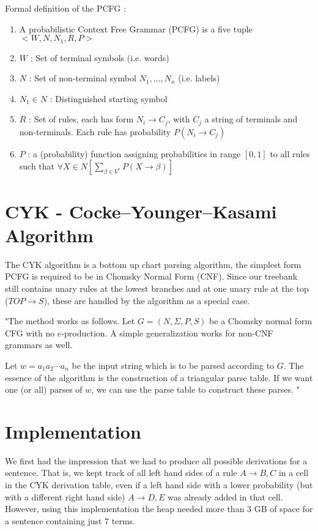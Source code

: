 \documentclass[11pt,twocolumn]{article}
\begin{document}
Formal definition of the PCFG \cite{slides2}:
\begin{enumerate}
\item A probabilistic Context Free Grammar (PCFG) is a five tuple $< W, N, N_1, R, P >$
\item $W$ : Set of terminal symbols (i.e. words)
\item $N$ : Set of non-terminal symbol $N_1, \ldots , N_n$ (i.e. labels)
\item $N_1 \in N$ : Distinguished starting symbol
\item $R$ : Set of rules, each has form $N_i \rightarrow C_j$, with $C_j$ a string of terminals and non-terminals. Each rule has probability $P (N_i \rightarrow C_j )$
\item $P$ : a (probability) function assigning probabilities in range $[0, 1]$ to all rules such that $\forall X \in N \left[ \sum_{\beta \in V^*} P (X \rightarrow \beta) \right]$
\end{enumerate}

\section{CYK - Cocke–Younger–Kasami Algorithm}
The CYK algorithm is a bottom up chart parsing algorithm, the simplest form PCFG is required to be in Chomsky Normal Form (CNF). Since our treebank still contains unary rules at the lowest branches and at one unary rule at the top ($TOP \rightarrow S$), these are handled by the algorithm as a special case.

"The method works as follows. Let $G = (N, \Sigma , P, S)$ be a Chomsky normal form CFG with no $e$-production. A simple generalization works for non-CNF grammars as well. 

Let $w = a_1 a_2 \cdots a_n$ be the input string which is to be parsed according to $G$. The essence of the algorithm is the construction of a triangular parse table. If we want one (or all) parses of $w$, we can use the parse table to construct these parses. \cite{cyk}"

\section{Implementation}
We first had the impression that we had to produce all possible derivations for a sentence. That is, we kept track of all left hand sides of a rule $A \rightarrow B, C$ in a cell in the CYK derivation table, even if a left hand side with a lower probability (but with a different right hand side) $A \rightarrow D, E$ was already added in that cell. However, using this implementation the heap needed more than $3$ GB of space for a sentence containing just $7$ terms. 
\end{document}
